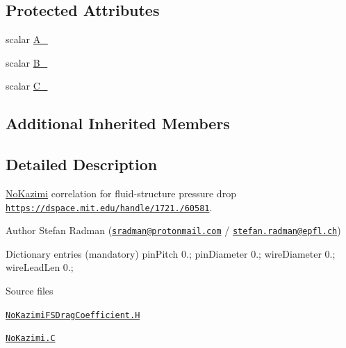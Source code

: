 \subsection*{Protected Attributes}
\begin{DoxyCompactItemize}
\item 
scalar \hyperlink{classFoam_1_1FSDragCoefficientModels_1_1NoKazimi_a470f484be0b7ecd159b0971e3023a490}{A\+\_\+}
\item 
scalar \hyperlink{classFoam_1_1FSDragCoefficientModels_1_1NoKazimi_ad44554fe371bb59836624cad1c370de7}{B\+\_\+}
\item 
scalar \hyperlink{classFoam_1_1FSDragCoefficientModels_1_1NoKazimi_af3f148ae868a08db7f6a83a3a64a236a}{C\+\_\+}
\end{DoxyCompactItemize}
\subsection*{Additional Inherited Members}


\subsection{Detailed Description}
\hyperlink{classFoam_1_1FSDragCoefficientModels_1_1NoKazimi}{No\+Kazimi} correlation for fluid-\/structure pressure drop \href{https://dspace.mit.edu/handle/1721.1/60581}{\tt https\+://dspace.\+mit.\+edu/handle/1721./60581}. 

\label{_Description}%
 Author Stefan Radman (\href{mailto:sradman@protonmail.com}{\tt sradman@protonmail.\+com} / \href{mailto:stefan.radman@epfl.ch}{\tt stefan.\+radman@epfl.\+ch})

Dictionary entries (mandatory) pin\+Pitch 0.; pin\+Diameter 0.; wire\+Diameter 0.; wire\+Lead\+Len 0.;

\begin{DoxyParagraph}{Source files}

\begin{DoxyItemize}
\item \href{../../../home/carlo/data/GeN-Foam/GeN-Foam_ffn/GeN-Foam/GeN-Foam/classes/thermalHydraulics/src/physicsModels/dragModels/FSDragCoefficientModels/NoKazimi/NoKazimiFSDragCoefficient.H}{\tt No\+Kazimi\+F\+S\+Drag\+Coefficient.\+H} 
\item \href{../../../home/carlo/data/GeN-Foam/GeN-Foam_ffn/GeN-Foam/GeN-Foam/classes/thermalHydraulics/src/physicsModels/dragModels/FSDragCoefficientModels/NoKazimi/NoKazimi.C}{\tt No\+Kazimi.\+C} 
\end{DoxyItemize}
\end{DoxyParagraph}


